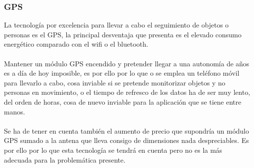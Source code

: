 \documentclass[a4paper ,12pt, onecolumn]{article}
\begin{document}
        \subsubsection {GPS}
            La tecnología por excelencia para llevar a cabo el seguimiento de objetos o personas es el GPS, la principal desventaja
            que presenta es el elevado consumo energético comparado con el wifi o el bluetooth.
            \paragraph{}
            Mantener un módulo GPS encendido y pretender llegar a una autonomía de años es a día de hoy
            imposible, es por ello por lo que o se emplea un teléfono móvil para llevarlo a cabo, cosa inviable si se pretende 
            monitorizar objetos  y no personas en movimiento, o el tiempo de refresco de los datos ha de ser muy lento, del orden de horas,
            cosa de nuevo inviable para la aplicación que se tiene entre manos.
            \paragraph{}
            Se ha de tener en cuenta también el aumento de precio que supondría un módulo GPS sumado a la antena que lleva consigo de 
            dimensiones nada despreciables. 
            Es por ello por lo que esta tecnología se tendrá en cuenta pero no es la más adecuada para la problemática presente.
\end{document}
